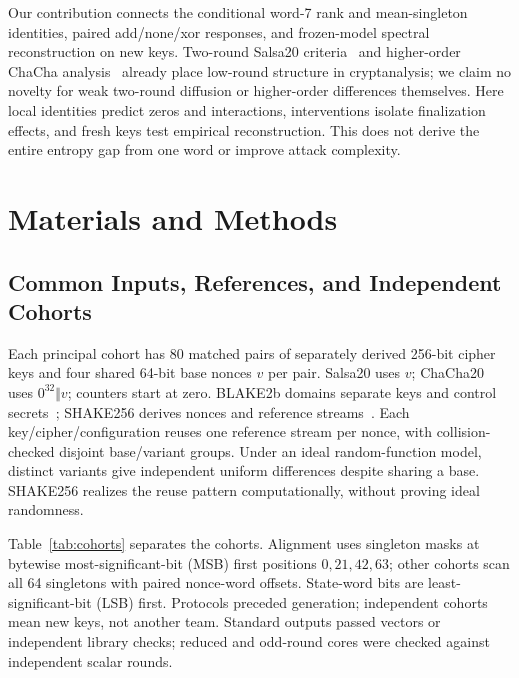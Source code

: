 \documentclass[electronics,article,submit,pdftex,oneauthor]{Definitions/mdpi}
\begin{document}
Our contribution connects the conditional word-7 rank and mean-singleton identities, paired add/none/xor responses, and frozen-model spectral reconstruction on new keys. Two-round Salsa20 criteria~\citep{dey2025tosc} and higher-order ChaCha analysis~\citep{ghafoori2024hodl} already place low-round structure in cryptanalysis; we claim no novelty for weak two-round diffusion or higher-order differences themselves. Here local identities predict zeros and interactions, interventions isolate finalization effects, and fresh keys test empirical reconstruction. This does not derive the entire entropy gap from one word or improve attack complexity.


\section{Materials and Methods}
\subsection{Common Inputs, References, and Independent Cohorts}

Each principal cohort has 80 matched pairs of separately derived 256-bit cipher keys and four shared 64-bit base nonces $v$ per pair. Salsa20 uses $v$; ChaCha20 uses $0^{32}\Vert v$; counters start at zero. BLAKE2b domains separate keys and control secrets~\citep{saarinen2015}; SHAKE256 derives nonces and reference streams~\citep{nist2015sha3}. Each key/cipher/configuration reuses one reference stream per nonce, with collision-checked disjoint base/variant groups. Under an ideal random-function model, distinct variants give independent uniform differences despite sharing a base. SHAKE256 realizes the reuse pattern computationally, without proving ideal randomness.

Table~\ref{tab:cohorts} separates the cohorts. Alignment uses singleton masks at bytewise most-significant-bit (MSB) first positions $0,21,42,63$; other cohorts scan all 64 singletons with paired nonce-word offsets. State-word bits are least-significant-bit (LSB) first. Protocols preceded generation; independent cohorts mean new keys, not another team. Standard outputs passed vectors or independent library checks; reduced and odd-round cores were checked against independent scalar rounds.
\end{document}
